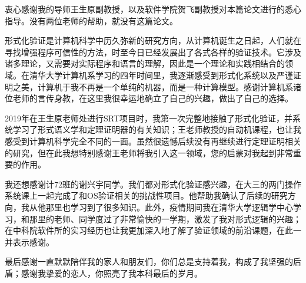 
\begin{acknowledgements}
  衷心感谢我的导师王生原副教授，以及软件学院贺飞副教授对本篇论文进行的悉心指导。没有两位老师的帮助，就没有这篇论文。
  
  形式化验证是计算机科学中历久弥新的研究方向，从计算机诞生之日起，人们就在寻找增强程序可信性的方法，时至今日已经发展出了各式各样的验证技术。它涉及诸多理论，又需要对实际程序和语言的理解，因此是一个理论和实践相结合的领域。在清华大学计算机系学习的四年时间里，我逐渐感受到形式化系统以及严谨证明之美，计算机于我不再是一个单纯的机器，而是一种计算模型。感谢计算机系诸位老师的言传身教，在这里我很幸运地确立了自己的兴趣，做出了自己的选择。
  
  2019年在王生原老师处进行SRT项目时，我第一次完整地接触了形式化验证，并系统学习了形式语义学和定理证明器的有关知识；王老师教授的自动机课程，也让我感受到计算机科学完全不同的一面。虽然很遗憾后续没有再继续进行定理证明相关的研究，但在此我想特别感谢王老师将我引入这一领域，您的启蒙对我起到非常重要的作用。
  
  我还想感谢计72班的谢兴宇同学。我们都对形式化验证感兴趣，在大三的两门操作系统课上一起完成了和OS验证相关的挑战性项目。他帮助我确认了后续的研究方向，我从他那里也学习到了很多知识。此外，疫情期间我在清华大学逻辑学中心学习，和那里的老师、同学度过了非常愉快的一学期，激发了我对形式逻辑的兴趣；在中科院软件所的实习经历也让我更加深入地了解了验证领域的前沿课题，在此一并表示感谢。
  
  最后感谢一直默默陪伴我的家人和朋友们，你们总是支持着我，构成了我坚强的后盾；感谢我挚爱的恋人，你照亮了我本科最后的岁月。
\end{acknowledgements}
